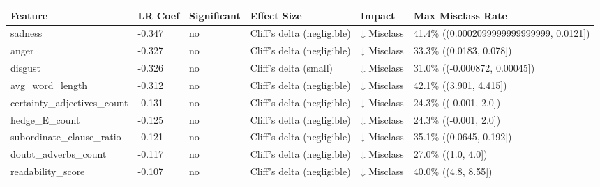 \begin{tabular}{llllll}
\toprule
Feature & LR Coef & Significant & Effect Size & Impact & Max Misclass Rate \\
\midrule
sadness & -0.347 & no & Cliff's delta (negligible) & ↓ Misclass & 41.4\% ((0.0002099999999999999, 0.0121]) \\
anger & -0.327 & no & Cliff's delta (negligible) & ↓ Misclass & 33.3\% ((0.0183, 0.078]) \\
disgust & -0.326 & no & Cliff's delta (small) & ↓ Misclass & 31.0\% ((-0.000872, 0.00045]) \\
avg\_word\_length & -0.312 & no & Cliff's delta (negligible) & ↓ Misclass & 42.1\% ((3.901, 4.415]) \\
certainty\_adjectives\_count & -0.131 & no & Cliff's delta (negligible) & ↓ Misclass & 24.3\% ((-0.001, 2.0]) \\
hedge\_E\_count & -0.125 & no & Cliff's delta (negligible) & ↓ Misclass & 24.3\% ((-0.001, 2.0]) \\
subordinate\_clause\_ratio & -0.121 & no & Cliff's delta (negligible) & ↓ Misclass & 35.1\% ((0.0645, 0.192]) \\
doubt\_adverbs\_count & -0.117 & no & Cliff's delta (negligible) & ↓ Misclass & 27.0\% ((1.0, 4.0]) \\
readability\_score & -0.107 & no & Cliff's delta (negligible) & ↓ Misclass & 40.0\% ((4.8, 8.55]) \\
\bottomrule
\end{tabular}
